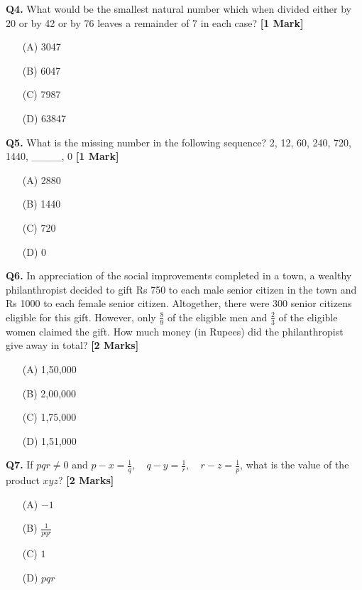\documentclass[11pt]{article}
\newcommand{\questiona}[2]{
    \noindent\textbf{Q#2.} #1 \hfill \textbf{[1 Mark]}
}
\newcommand{\questionb}[2]{
    \noindent\textbf{Q#2.} #1 \hfill \textbf{[2 Marks]}
}
\begin{document}
\questiona{What would be the smallest natural number which when divided either by 20 or by 42 or by 76 leaves a remainder of 7 in each case?}{4}
\begin{enumerate}
    \item[(A)] 3047  
    \item[(B)] 6047  
    \item[(C)] 7987  
    \item[(D)] 63847  
\end{enumerate}
\vspace{0.5cm}

\questiona{What is the missing number in the following sequence? 2, 12, 60, 240, 720, 1440, \_\_\_\_, 0}{5}
\begin{enumerate}
    \item[(A)] 2880  
    \item[(B)] 1440  
    \item[(C)] 720  
    \item[(D)] 0  
\end{enumerate}
\vspace{0.5cm}

\questionb{In appreciation of the social improvements completed in a town, a wealthy philanthropist decided to gift Rs 750 to each male senior citizen in the town and Rs 1000 to each female senior citizen. Altogether, there were 300 senior citizens eligible for this gift. However, only \(\frac{8}{9}\) of the eligible men and \(\frac{2}{3}\) of the eligible women claimed the gift. How much money (in Rupees) did the philanthropist give away in total?}{6}
\begin{enumerate}
    \item[(A)] 1,50,000  
    \item[(B)] 2,00,000  
    \item[(C)] 1,75,000  
    \item[(D)] 1,51,000  
\end{enumerate}
\vspace{0.5cm}

\questionb{If \(pqr \neq 0\) and \(p - x = \frac{1}{q}, \quad q - y = \frac{1}{r}, \quad r - z = \frac{1}{p}\), what is the value of the product \(xyz\)?}{7}
\begin{enumerate}
    \item[(A)] \(-1\)  
    \item[(B)] \(\frac{1}{pqr}\)  
    \item[(C)] \(1\)  
    \item[(D)] \(pqr\)  
\end{enumerate}
\vspace{0.5cm}
\end{document}

